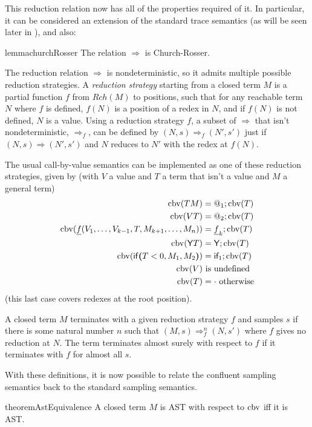 \medskip
This reduction relation now has all of the properties required of it. In particular, it can be considered an extension of the standard trace semantics (as will be seen later in ), and also:
\begin{restatable}{lemma}{churchRosser} \label{churchRosser}
The relation $\Rightarrow$ is Church-Rosser.
\end{restatable}

\medskip
The reduction relation $\Rightarrow$ is nondeterministic, so it admits multiple possible reduction strategies. 
A \emph{reduction strategy} starting from a closed term $M$ is a partial function $f$ from $\mathit{Rch}(M)$ to positions, such that for any reachable term $N$ where $f$ is defined, $f(N)$ is a position of a redex in $N$, and if $f(N)$ is not defined, $N$ is a value.
Using a reduction strategy $f$, a subset of $\Rightarrow$ that isn't nondeterministic, $\Rightarrow_f$, can be defined by $(N,s) \Rightarrow_f (N',s')$ just if $(N,s) \Rightarrow (N',s')$ and $N$ reduces to $N'$ with the redex at $f(N)$.

The usual call-by-value semantics can be implemented as one of these reduction strategies, given by (with $V$ a value and $T$ a term that isn't a value and $M$ a general term)
\begin{align*}
\operatorname{cbv}(T M) & = @_1 ; \operatorname{cbv}(T) \\
\operatorname{cbv}(V T) & = @_2 ; \operatorname{cbv}(T) \\
\operatorname{cbv}(\underline f(V_1, \dots, V_{k-1}, T, M_{k+1}, \dots, M_n)) & = \underline f_k ; \operatorname{cbv}(T) \\
\operatorname{cbv}(\mathsf{Y} T) & = \mathsf{Y} ; \operatorname{cbv}(T) \\
\operatorname{cbv}(\mathsf{if}\boldsymbol{(}T < 0, M_1, M_2\boldsymbol{)}) & = \textsf{if}_1 ; \operatorname{cbv}(T) \\
\operatorname{cbv}(V) & \text{ is undefined} \\
\operatorname{cbv}(T) & = \cdot \text{ otherwise}
\end{align*}
(this last case covers redexes at the root position).

A closed term $M$ terminates with a given reduction strategy $f$ and samples $s$ if there is some natural number $n$ such that $(M,s) \Rightarrow_f^n (N,s')$ where $f$ gives no reduction at $N$. The term terminates almost surely with respect to $f$ if it terminates with $f$ for almost all $s$.

With these definitions, it is now possible to relate the confluent sampling semantics back to the standard sampling semantics.

\begin{restatable}{theorem}{AstEquivalence} \label{thm:AstEquivalence}
A closed term $M$ is AST with respect to $\operatorname{cbv}$ iff it is AST.
\end{restatable}

